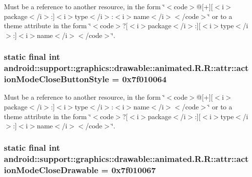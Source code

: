 Must be a reference to another resource, in the form \char`\"{}$<$code$>$@\mbox{[}+\mbox{]}\mbox{[}$<$i$>$package$<$/i$>$:\mbox{]}$<$i$>$type$<$/i$>$:$<$i$>$name$<$/i$>$$<$/code$>$\char`\"{} or to a theme attribute in the form \char`\"{}$<$code$>$?\mbox{[}$<$i$>$package$<$/i$>$:\mbox{]}\mbox{[}$<$i$>$type$<$/i$>$:\mbox{]}$<$i$>$name$<$/i$>$$<$/code$>$\char`\"{}. \hypertarget{classandroid_1_1support_1_1graphics_1_1drawable_1_1animated_1_1_r_1_1attr_89c29e9c8e22997992257e125730bd33}{
\subsubsection[{actionModeCloseButtonStyle}]{\setlength{\rightskip}{0pt plus 5cm}static final int android::support::graphics::drawable::animated.R.R::attr::actionModeCloseButtonStyle = 0x7f010064}}
\label{classandroid_1_1support_1_1graphics_1_1drawable_1_1animated_1_1_r_1_1attr_89c29e9c8e22997992257e125730bd33}


Must be a reference to another resource, in the form \char`\"{}$<$code$>$@\mbox{[}+\mbox{]}\mbox{[}$<$i$>$package$<$/i$>$:\mbox{]}$<$i$>$type$<$/i$>$:$<$i$>$name$<$/i$>$$<$/code$>$\char`\"{} or to a theme attribute in the form \char`\"{}$<$code$>$?\mbox{[}$<$i$>$package$<$/i$>$:\mbox{]}\mbox{[}$<$i$>$type$<$/i$>$:\mbox{]}$<$i$>$name$<$/i$>$$<$/code$>$\char`\"{}. \hypertarget{classandroid_1_1support_1_1graphics_1_1drawable_1_1animated_1_1_r_1_1attr_a1e5d987ff89637fcf6eeb8dc354b5d1}{
\subsubsection[{actionModeCloseDrawable}]{\setlength{\rightskip}{0pt plus 5cm}static final int android::support::graphics::drawable::animated.R.R::attr::actionModeCloseDrawable = 0x7f010067}}
\label{classandroid_1_1support_1_1graphics_1_1drawable_1_1animated_1_1_r_1_1attr_a1e5d987ff89637fcf6eeb8dc354b5d1}


